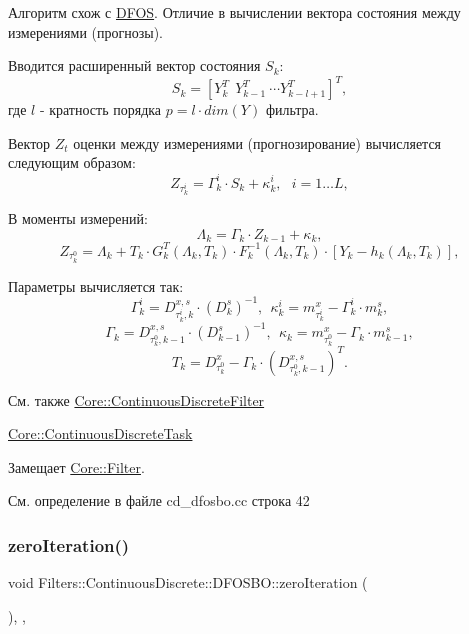 Алгоритм схож с \hyperlink{class_filters_1_1_continuous_discrete_1_1_d_f_o_s}{D\+F\+OS}. Отличие в вычислении вектора состояния между измерениями (прогнозы).

Вводится расширенный вектор состояния $S_k$\+: \[ S_k = [Y_k^T\ \ Y_{k-1}^T\ \cdots Y_{k-l+1}^T]^T,\] где $l$ -\/ кратность порядка $p = l \cdot dim(Y)$ фильтра.

Вектор $Z_t$ оценки между измерениями (прогнозирование) вычисляется следующим образом\+: \[Z_{\tau_k^i} = \Gamma_k^i \cdot S_k + \kappa_k^i,\ \ \ i = 1 \ldots L,\]

В моменты измерений\+: \[\Lambda_k = \Gamma_k \cdot Z_{k-1} + \kappa_k,\] \[Z_{\tau_k^0} = \Lambda_k + T_k \cdot G_k^T(\Lambda_k, T_k) \cdot F_k^{-1}(\Lambda_k, T_k) \cdot [Y_k - h_k(\Lambda_k, T_k)],\]

Параметры вычисляется так\+: \[\Gamma_k^i = D_{\tau_k^i,k}^{x,s} \cdot (D_k^s)^{-1},\ \ \kappa_k^i = m_{\tau_k^i}^x - \Gamma_k^i \cdot m_k^s,\] \[\Gamma_k = D_{\tau_k^0,k-1}^{x,s} \cdot (D_{k-1}^s)^{-1},\ \ \kappa_k = m_{\tau_k^0}^x - \Gamma_k \cdot m_{k-1}^s,\] \[T_k = D_{\tau_k^0}^x - \Gamma_k \cdot (D_{\tau_k^0,k-1}^{x,s})^T.\]

\begin{DoxySeeAlso}{См. также}
\hyperlink{class_core_1_1_continuous_discrete_filter}{Core\+::\+Continuous\+Discrete\+Filter} 

\hyperlink{class_core_1_1_continuous_discrete_task}{Core\+::\+Continuous\+Discrete\+Task} 
\end{DoxySeeAlso}


Замещает \hyperlink{class_core_1_1_filter_a438681ee3e54aba2148042d9f8011ab8}{Core\+::\+Filter}.



См. определение в файле cd\+\_\+dfosbo.\+cc строка 42

\hypertarget{class_filters_1_1_continuous_discrete_1_1_d_f_o_s_b_o_a958c75df5031558a244d553f13376e75}{}\label{class_filters_1_1_continuous_discrete_1_1_d_f_o_s_b_o_a958c75df5031558a244d553f13376e75} 
\subsubsection{\texorpdfstring{zero\+Iteration()}{zeroIteration()}}
{\footnotesize\ttfamily void Filters\+::\+Continuous\+Discrete\+::\+D\+F\+O\+S\+B\+O\+::zero\+Iteration (\begin{DoxyParamCaption}{ }\end{DoxyParamCaption})\hspace{0.3cm}{\ttfamily [override]}, {\ttfamily [protected]}, {\ttfamily [virtual]}}



